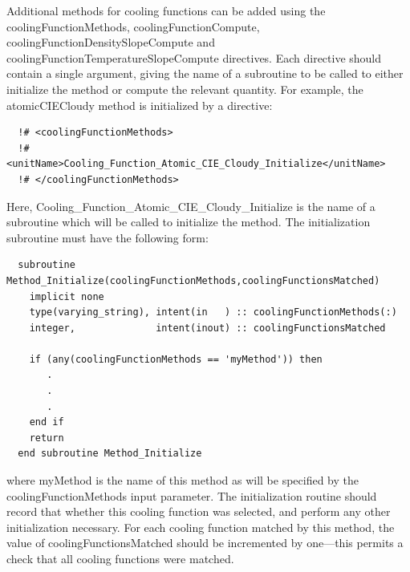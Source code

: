 Additional methods for cooling functions can be added using the {\normalfont \ttfamily coolingFunctionMethods}, {\normalfont \ttfamily coolingFunctionCompute}, {\normalfont \ttfamily coolingFunctionDensitySlopeCompute} and {\normalfont \ttfamily coolingFunctionTemperatureSlopeCompute} directives. Each directive should contain a single argument, giving the name of a subroutine to be called to either initialize the method or compute the relevant quantity. For example, the {\normalfont \ttfamily atomicCIECloudy} method is initialized by a directive:
\begin{verbatim}
  !# <coolingFunctionMethods>
  !#  <unitName>Cooling_Function_Atomic_CIE_Cloudy_Initialize</unitName>
  !# </coolingFunctionMethods>
\end{verbatim}
Here, {\normalfont \ttfamily Cooling\_Function\_Atomic\_CIE\_Cloudy\_Initialize} is the name of a subroutine which will be called to initialize the method. The initialization subroutine must have the following form:
\begin{verbatim}
  subroutine Method_Initialize(coolingFunctionMethods,coolingFunctionsMatched)
    implicit none
    type(varying_string), intent(in   ) :: coolingFunctionMethods(:)
    integer,              intent(inout) :: coolingFunctionsMatched
    
    if (any(coolingFunctionMethods == 'myMethod')) then
       .
       .
       .
    end if
    return
  end subroutine Method_Initialize
\end{verbatim}
where {\normalfont \ttfamily myMethod} is the name of this method as will be specified by the {\normalfont \ttfamily coolingFunctionMethods} input parameter. The initialization routine should record that whether this cooling function was selected, and perform any other initialization necessary. For each cooling function matched by this method, the value of {\normalfont \ttfamily coolingFunctionsMatched} should be incremented by one---this permits a check that all cooling functions were matched.

